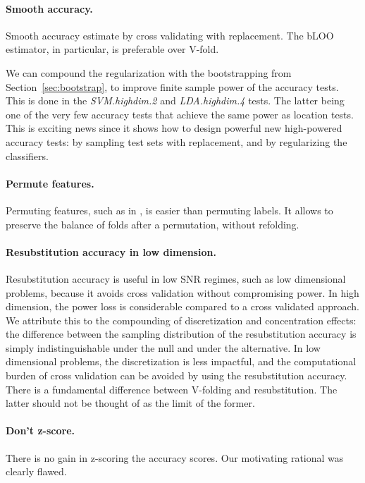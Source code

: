 \documentclass[12pt,a4paper]{article}
\begin{document}
\paragraph{Smooth accuracy.}
Smooth accuracy estimate by cross validating with replacement. The bLOO estimator, in particular, is preferable over V-fold.

We can compound the regularization with the bootstrapping from Section~\ref{sec:bootstrap}, to improve finite sample power of the accuracy tests. 
This is done in the \emph{SVM.highdim.2} and \emph{LDA.highdim.4} tests. 
The latter being one of the very few accuracy tests that achieve the same power as location tests. 
This is exciting news since it shows how to design powerful new high-powered accuracy tests: by sampling test sets with replacement, and by regularizing the classifiers. 


\paragraph{Permute features.} Permuting features, such as in \cite{golland_permutation_2005}, is easier than permuting labels. 
It allows to preserve the balance of folds after a permutation, without refolding.

\paragraph{Resubstitution accuracy in low dimension.} Resubstitution accuracy is useful in low SNR regimes, such as low dimensional problems, because it avoids cross validation without compromising power. 
In high dimension, the power loss is considerable compared to a cross validated approach. 
We attribute this to the compounding of discretization and concentration effects: the difference between the sampling distribution of the resubstitution accuracy is simply indistinguishable under the null and under the alternative. 
In low dimensional problems, the discretization is less impactful, and the computational burden of cross validation can be avoided by using the resubstitution accuracy. 
There is a fundamental difference between V-folding and resubstitution. The latter should not be thought of as the limit of the former. 
 

\paragraph{Don't z-score.} There is no gain in z-scoring the accuracy scores. Our motivating rational was clearly flawed. %
\end{document}
